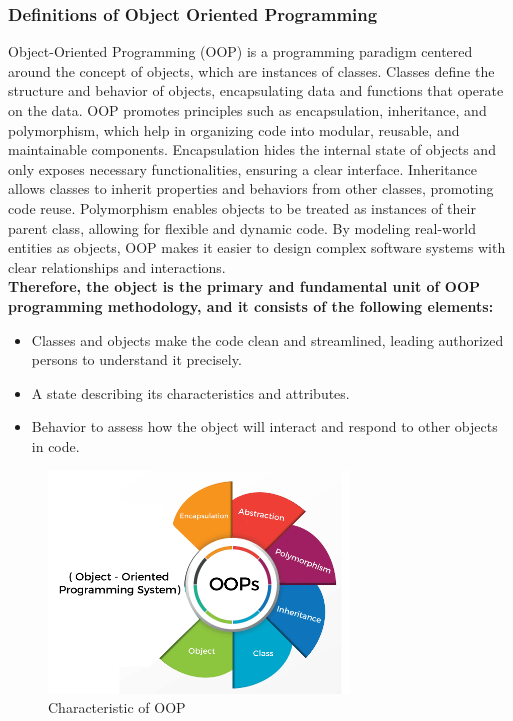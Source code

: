 \documentclass[12pt]{article}
\begin{document}
\subsubsection{Definitions of Object Oriented Programming}
Object-Oriented Programming (OOP) is a programming paradigm centered around the concept of objects, which are instances of classes. Classes define the structure and behavior of objects, encapsulating data and functions that operate on the data. OOP promotes principles such as encapsulation, inheritance, and polymorphism, which help in organizing code into modular, reusable, and maintainable components. Encapsulation hides the internal state of objects and only exposes necessary functionalities, ensuring a clear interface. Inheritance allows classes to inherit properties and behaviors from other classes, promoting code reuse. Polymorphism enables objects to be treated as instances of their parent class, allowing for flexible and dynamic code. By modeling real-world entities as objects, OOP makes it easier to design complex software systems with clear relationships and interactions.
\\
\textbf{Therefore, the object is the primary and fundamental unit of OOP programming methodology, and it consists of the following elements:}
\begin{itemize}
    \item Classes and objects make the code clean and streamlined, leading authorized persons to understand it precisely.
    \item A state describing its characteristics and attributes.
    \item Behavior to assess how the object will interact and respond to other objects in code.
\end{itemize}


\begin{figure}[h!]
\begin{center}
\includegraphics[width=8cm]{Intro3.png}\\
Characteristic of OOP
\end{center}
\end{figure}
\end{document}
